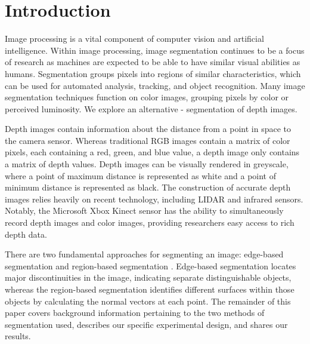 
\section{Introduction}
\label{sec:intro}
Image processing is a vital component of computer vision and
artificial intelligence. Within image processing, image segmentation
continues to be a focus of research as machines are expected to be
able to have similar visual abilities as humans. Segmentation 
groups pixels into regions of similar characteristics, which can be used
for automated analysis, tracking, and object recognition.  Many image segmentation techniques function on color images, grouping pixels by color or perceived luminosity.  We explore an alternative - segmentation of depth images.

Depth images contain information about the distance from a point in space to the camera sensor. Whereas traditional RGB images contain a matrix
of color pixels, each containing a red, green, and blue value, a depth image
only contains a matrix of depth values. Depth images can be visually
rendered in greyscale, where a point of maximum distance
is represented as white and a point of minimum distance is represented
as black. The construction of accurate depth images relies heavily on recent technology, including LIDAR and infrared sensors.  Notably, the Microsoft Xbox Kinect
sensor has the ability to simultaneously record depth images and color
images, providing researchers easy access to rich depth data.

There are two fundamental approaches for segmenting an image: edge-based
segmentation and region-based segmentation \cite{aima}. Edge-based
segmentation locates major discontinuities in the image, indicating
separate distinguishable objects, whereas the region-based segmentation
identifies different surfaces within those objects by calculating the
normal vectors at each point. The remainder of this paper covers
background information pertaining to the two methods of segmentation used,
describes our specific experimental design, and shares our results. 


